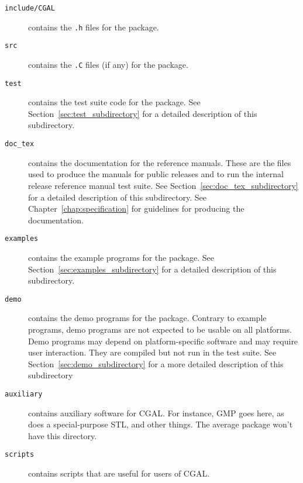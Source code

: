 \begin{description}
  \item[{\tt include/CGAL}]
       contains the {\tt .h} files for the package.
  \item[{\tt src}]
       contains the {\tt .C} files (if any) for the package.
  \item[{\tt test}]
       contains the test suite code for the package.  See
       Section~\ref{sec:test_subdirectory} for a detailed description of this 
       subdirectory.
  \item[{\tt doc\_tex}]
       contains the documentation for the reference manuals.
       These are the files used to produce the manuals for public releases and
       to run the internal release reference manual test suite.
       See Section~\ref{sec:doc_tex_subdirectory} for a detailed description 
       of this subdirectory.
       See Chapter~\ref{chap:specification} for guidelines for producing
       the documentation.
  \item[{\tt examples}]
       contains the example programs for the package.
       See Section~\ref{sec:examples_subdirectory} for a detailed 
       description of this subdirectory.
  \item[{\tt demo}]
       contains the demo programs for the package.
       Contrary to example programs, demo programs are not expected to be
       usable on all platforms. Demo programs may depend on platform-specific
       software and may require user interaction.  They are compiled but not
       run in the test suite. See Section~\ref{sec:demo_subdirectory} for a
       more detailed description of this subdirectory
  \item[{\tt auxiliary}]
       contains auxiliary software for CGAL. For instance,
       GMP goes here, as does a special-purpose STL, and other things. The 
       average package won't have this directory.
  \item[{\tt scripts}]
       contains scripts that are useful for users of CGAL.

\end{description}
